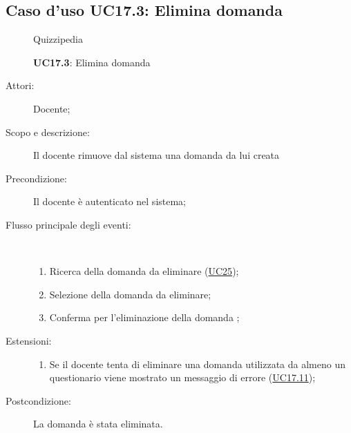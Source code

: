 \subsection{Caso d'uso UC17.3: Elimina domanda}
\begin{figure}[H]
	\centering
	\begin{resizedtikzpicture}{\textwidth}
		\begin{umlsystem}[x=0, fill=lightgray!20]{Quizzipedia}
		\end{umlsystem}
	\end{resizedtikzpicture}
	\caption{\textbf{UC17.3}: Elimina domanda}
	\label{UC17.3}
\end{figure}
\begin{description}
	\item[Attori:] Docente;
	\item[Scopo e descrizione:] Il docente rimuove dal sistema una domanda da lui creata
	\item[Precondizione:] Il docente è autenticato nel sistema;
	
	\item[Flusso principale degli eventi:] \ 
	\begin{enumerate}
		\item Ricerca della domanda da eliminare (\hyperlink{UC25}{UC25});
		\item Selezione della domanda da eliminare;
		\item Conferma per l'eliminazione della domanda	;
		
	\end{enumerate}
	\item[Estensioni:]
	\begin{enumerate}
		\item Se il docente tenta di eliminare una domanda utilizzata da almeno un questionario viene mostrato un messaggio di errore (\hyperlink{UC17.11}{UC17.11});
		
	\end{enumerate}
	\item[Postcondizione:] La domanda è stata eliminata.
\end{description}
\hypertarget{UC17.4}{}
